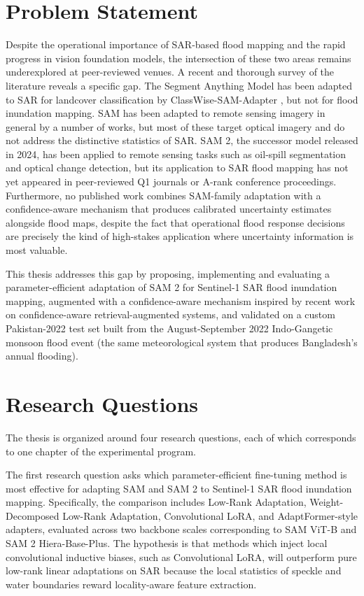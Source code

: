 \documentclass[11pt,a4paper,oneside]{report}
\begin{document}
\section{Problem Statement}

Despite the operational importance of SAR-based flood mapping and the rapid progress in vision foundation models, the intersection of these two areas remains underexplored at peer-reviewed venues. A recent and thorough survey of the literature reveals a specific gap. The Segment Anything Model has been adapted to SAR for landcover classification by ClassWise-SAM-Adapter \cite{Pu2025CWSAM}, but not for flood inundation mapping. SAM has been adapted to remote sensing imagery in general by a number of works, but most of these target optical imagery and do not address the distinctive statistics of SAR. SAM 2, the successor model released in 2024, has been applied to remote sensing tasks such as oil-spill segmentation and optical change detection, but its application to SAR flood mapping has not yet appeared in peer-reviewed Q1 journals or A-rank conference proceedings. Furthermore, no published work combines SAM-family adaptation with a confidence-aware mechanism that produces calibrated uncertainty estimates alongside flood maps, despite the fact that operational flood response decisions are precisely the kind of high-stakes application where uncertainty information is most valuable.

This thesis addresses this gap by proposing, implementing and evaluating a parameter-efficient adaptation of SAM 2 for Sentinel-1 SAR flood inundation mapping, augmented with a confidence-aware mechanism inspired by recent work on confidence-aware retrieval-augmented systems, and validated on a custom Pakistan-2022 test set built from the August-September 2022 Indo-Gangetic monsoon flood event (the same meteorological system that produces Bangladesh's annual flooding).

\section{Research Questions}

The thesis is organized around four research questions, each of which corresponds to one chapter of the experimental program.

The first research question asks which parameter-efficient fine-tuning method is most effective for adapting SAM and SAM 2 to Sentinel-1 SAR flood inundation mapping. Specifically, the comparison includes Low-Rank Adaptation, Weight-Decomposed Low-Rank Adaptation, Convolutional LoRA, and AdaptFormer-style adapters, evaluated across two backbone scales corresponding to SAM ViT-B and SAM 2 Hiera-Base-Plus. The hypothesis is that methods which inject local convolutional inductive biases, such as Convolutional LoRA, will outperform pure low-rank linear adaptations on SAR because the local statistics of speckle and water boundaries reward locality-aware feature extraction.
\end{document}
